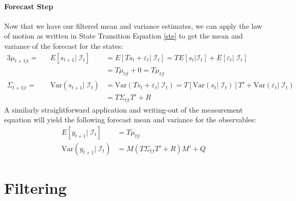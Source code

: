 \documentclass[a4paper,12pt]{article}
\begin{document}
\paragraph{Forecast Step} Now that we have our filtered
mean and variance estimates, we can apply the law of
motion as written in State Transition Equation \ref{ste} to get the mean and variance of the forecast for
the states:
\begin{alignat*}{3}
  \mu_{t+1|t} =&& E[s_{t+1}|\;\mathcal{I}_{t}] &= 
    E[Ts_t + \varepsilon_t |\;\mathcal{I}_{t}] = 
    TE[s_t | \mathcal{I}_{t}] 
    + E[\varepsilon_t |\;\mathcal{I}_{t}]  \\
    && &= T\mu_{t|t} + 0 = T\mu_{t|t} \\
  \Sigma_{t+1|t} = &&\text{Var}(s_{t+1}|\;\mathcal{I}_{t})
  &= \text{Var}(Ts_t + \varepsilon_t |\;\mathcal{I}_{t})
  = T[\text{Var}(s_t|\;\mathcal{I}_{t})]T'
  + \text{Var}(\varepsilon_t|\;\mathcal{I}_{t}) \\
  && &= T\Sigma_{t|t}T' + R
\end{alignat*}
A similarly straightforward application and writing-out of
the measurement equation will yield the following forecast
mean and variance for the observables:
\begin{align*}
  E[y_{t+1}|\;\mathcal{I}_{t}] &= T\mu_{t|t} \\
  \text{Var}(y_{t+1}|\;\mathcal{I}_{t})
    &= M\left(T\Sigma_{t|t}T' + R\right)M' + Q
\end{align*}



\section{Filtering}
\end{document}
